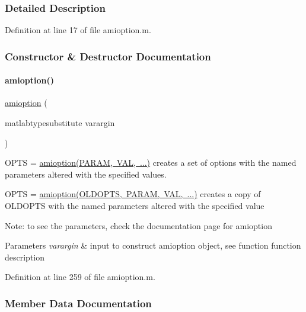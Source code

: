 \subsubsection{Detailed Description}


Definition at line 17 of file amioption.\+m.



\subsubsection{Constructor \& Destructor Documentation}
\mbox{\label{classamioption_a86c655c4010c1c2ddb3e68693a07ef37}} 
\paragraph{\texorpdfstring{amioption()}{amioption()}}
{\footnotesize\ttfamily \mbox{\hyperlink{classamioption}{amioption}} (\begin{DoxyParamCaption}\item[{matlabtypesubstitute}]{varargin }\end{DoxyParamCaption})}

O\+P\+TS = \mbox{\hyperlink{classamioption}{amioption(\+P\+A\+R\+A\+M, V\+A\+L, ...)}} creates a set of options with the named parameters altered with the specified values.

O\+P\+TS = \mbox{\hyperlink{classamioption}{amioption(\+O\+L\+D\+O\+P\+T\+S, P\+A\+R\+A\+M, V\+A\+L, ...)}} creates a copy of O\+L\+D\+O\+P\+TS with the named parameters altered with the specified value

Note\+: to see the parameters, check the documentation page for amioption


\begin{DoxyParams}{Parameters}
{\em varargin} & input to construct amioption object, see function function description \\
\hline
\end{DoxyParams}


Definition at line 259 of file amioption.\+m.



\subsubsection{Member Data Documentation}
\mbox{\label{classamioption_a0c5f3dcf809a17b895fe12fc91272349}} 
